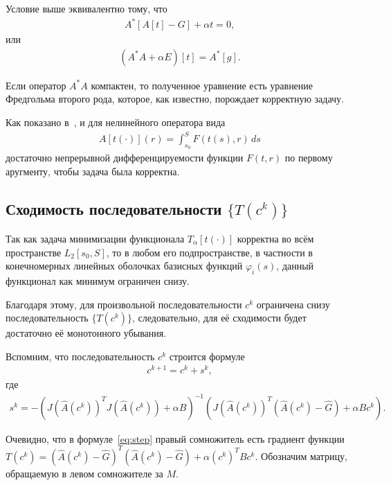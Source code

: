 \documentclass[a4paper,14pt]{extarticle}
\begin{document}
    Условие выше эквивалентно тому, что
    \begin{gather*}
        A^*[A[t] - G] + \alpha t = 0,
    \end{gather*}
    или
    \begin{gather*}
        (A^*A + \alpha E)[t] =  A^*[g].
    \end{gather*}

    Если оператор $A^*A$ компактен, то полученное уравнение есть уравнение
    Фредгольма второго рода, которое, как известно, порождает корректную задачу.

    Как показано в~\cite{bib:Jonca:1988}, и для нелинейного оператора вида
    \begin{gather*}
        A[t(\cdot)](r) =
        \int_{s_0}^{S} F(t(s), r) \, ds
    \end{gather*}
    достаточно непрерывной дифференцируемости функции $F(t, r)$ по первому аругменту,
    чтобы задача была корректна.

    \subsection{Сходимость последовательности $\{T(c^k)\}$}

    Так как задача минимизации функционала $T_{\alpha}[t(\cdot)]$ корректна
    во всём пространстве $L_2[s_0, S]$, то в любом его подпространстве,
    в частности в конечномерных линейных оболочках базисных функций
    $\varphi_i(s)$, данный функционал как минимум ограничен снизу.

    Благодаря этому, для произвольной последовательности $c^k$ ограничена
    снизу последовательность $\{T(c^k)\}$, следовательно,
    для её сходимости будет достаточно её монотонного убывания.

    Вспомним, что последовательность $c^k$ строится формуле
    \begin{gather*}
        c^{k+1} = c^k + s^k,
    \end{gather*}
    где
    \begin{gather}\label{eq:step}
        s^k
        = - \left(
        J(\hat{A}(c^k))^T J(\hat{A}(c^k))
        + \alpha  B
        \right)^{-1}
        \left(
        J(\hat{A}(c^k))^T (\hat{A}(c^k) - \hat{G})
        + \alpha  B c^k
        \right).
    \end{gather}

    Очевидно, что в формуле~\eqref{eq:step} правый сомножитель есть
    градиент функции $T(c^k) = (\hat{A}(c^k) - \hat{G})^T(\hat{A}(c^k) - \hat{G})
    + \alpha  (c^k)^{T} B c^k$.
    Обозначим матрицу, обращаемую в левом сомножителе за $M$.
\end{document}

